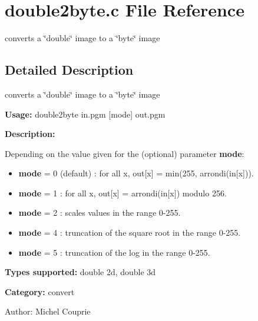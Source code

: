 \section{double2byte.c File Reference}
\label{double2byte_8c}
converts a \char`\"{}double\char`\"{} image to a \char`\"{}byte\char`\"{} image 



\subsection{Detailed Description}
converts a \char`\"{}double\char`\"{} image to a \char`\"{}byte\char`\"{} image 

{\bf Usage:} double2byte in.pgm [mode] out.pgm

{\bf Description:}

Depending on the value given for the (optional) parameter {\bf mode}: \begin{itemize}
\item {\bf mode} = 0 (default) : for all x, out[x] = min(255, arrondi(in[x])). \item {\bf mode} = 1 : for all x, out[x] = arrondi(in[x]) modulo 256. \item {\bf mode} = 2 : scales values in the range 0-255. \item {\bf mode} = 4 : truncation of the square root in the range 0-255. \item {\bf mode} = 5 : truncation of the log in the range 0-255.\end{itemize}
{\bf Types supported:} double 2d, double 3d

{\bf Category:} convert

\begin{Desc}
\item[Author:]Michel Couprie \end{Desc}
